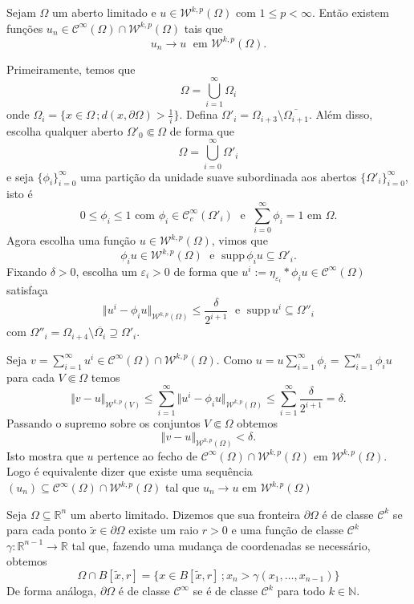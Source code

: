 \documentclass[a4paper, 11pt]{book}
\theoremstyle{definition}
\newcommand{\bN}{\mathbb{N}}
\newcommand{\bR}{\mathbb{R}}
\newcommand{\cC}{\mathcal{C}}
\newcommand{\cW}{\mathcal{W}}
\newcommand{\supp}{\mathrm{supp}\,}
\begin{document}
\begin{tbox}
    Sejam $\Omega$ um aberto limitado e $u \in \cW^{k,p}(\Omega)$ com $1 \leqslant p < \infty$.
    Então existem funções $u_n \in \cC^{\infty}(\Omega) \cap \cW^{k,p}(\Omega)$ tais que
    \[
        u_n \to u \;\text{ em } \cW^{k,p}(\Omega).
    \] 
\end{tbox}
\begin{prf}
    Primeiramente, temos que
    \[
        \Omega = \bigcup_{i=1}^\infty \Omega_i   
    \]
    onde $\Omega_i = \{x \in \Omega \,; d(x, \partial\Omega) > \tfrac{1}{i}\}$. Defina $\Omega'_i = \Omega_{i+3} \setminus \overline{\Omega_{i+1}}$.
    Além disso, escolha qualquer aberto $\Omega'_0 \Subset \Omega$ de forma que
    \[
        \Omega = \bigcup_{i=0}^\infty \Omega'_i
    \]
    e seja $\{\phi_i\}_{i=0}^\infty$ uma partição da unidade suave subordinada aos abertos $\{\Omega'_i\}_{i=0}^\infty$, isto é
    \[
       0 \leqslant \phi_i \leqslant 1 \text{ com } \phi_i \in \cC^\infty_c(\Omega'_i) \;\text{ e }\; \sum_{i=0}^\infty \phi_i = 1 \text{ em } \Omega.
    \]
    Agora escolha uma função $u \in \cW^{k,p}(\Omega)$, vimos que
    \[
        \phi_i u \in \cW^{k,p}(\Omega) \;\text{ e }\; \supp \phi_i u \subseteq \Omega'_i.
    \]
    Fixando $\delta > 0$, escolha um $\varepsilon_i > 0$ de forma que $u^i := \eta_{\varepsilon_i} * \phi_i u \in \cC^{\infty}(\Omega)$ satisfaça
    \[
        \Vert u^i - \phi_i u \Vert_{\cW^{k,p}(\Omega)} \leqslant \frac{\delta}{2^{i+1}} \;\text{ e }\; \supp u^i \subseteq \Omega''_i
    \]
    com $\Omega''_i = \Omega_{i+4} \setminus \overline{\Omega_{i}} \supseteq \Omega'_i$.

    Seja $v = \sum_{i=1}^\infty u^i \in \cC^{\infty}(\Omega) \cap \cW^{k,p}(\Omega)$.
    Como $u = u \sum_{i=1}^\infty \phi_i = \sum_{i=1}^n \phi_i u$ para cada $V \Subset \Omega$ temos
    \[
        \Vert v - u \Vert_{\cW^{k,p}(V)} \leqslant \sum_{i=1}^\infty \Vert u^i - \phi_i u \Vert_{\cW^{k,p}(\Omega)} \leqslant \sum_{i=1}^\infty \frac{\delta}{2^{i+1}} = \delta.
    \]
    Passando o supremo sobre os conjuntos $V \Subset \Omega$ obtemos
    \[
        \Vert v - u \Vert_{\cW^{k,p}(\Omega)} < \delta.
    \]
    Isto mostra que $u$ pertence ao fecho de $\cC^\infty(\Omega) \cap \cW^{k,p}(\Omega)$ em $\cW^{k,p}(\Omega)$. Logo é equivalente dizer que existe uma sequência $(u_n) \subseteq \cC^\infty(\Omega) \cap \cW^{k,p}(\Omega)$ tal que $u_n \to u$ em $\cW^{k,p}(\Omega)$
\end{prf}

\begin{dbox} \label{def:fronteira-ck}
    Seja $\Omega \subseteq \bR^n$ um aberto limitado. 
    Dizemos que sua fronteira $\partial \Omega$ é de classe $\cC^k$ se para cada ponto $\tilde x \in \partial \Omega$ existe um raio $r > 0$ e uma função de classe $\cC^k$ $\gamma : \bR^{n-1} \to \bR$ tal que, fazendo uma mudança de coordenadas se necessário, obtemos
    \[
        \Omega \cap B[\tilde x,r] = \{x \in B[\tilde x,r] \,; x_n > \gamma(x_1,\dots,x_{n-1})\}
    \]
    De forma análoga, $\partial\Omega$ é de classe $\cC^\infty$ se é de classe $\cC^k$ para todo $k \in \bN$.
\end{dbox}
\end{document}
